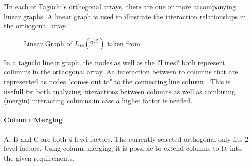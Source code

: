 "In each of Taguchi’s orthogonal arrays, there are one or more accompanying linear graphs. A linear graph is used to illustrate the interaction relationships in the orthogonal array."\cite{yang_design_2009}

\begin{figure}[H]
	\centering
{}
\caption{ Linear Graph of $L_{16}(2^{15})$ taken from \cite{yang_design_2009}}
\end{figure}


In a taguchi linear graph, the nodes as well as the ?Lines? both represent collumns in the orthogonal array. An interaction between to columns that are represented as nodes "comes out to" to the connecting line column \cite{taguchi_taguchis_2005}. This is usefull for both analyzing interactions between columns as well as combining (mergin) interacting columns in case a higher factor is needed.

\paragraph{Column Merging}
A, B and C are both 4 level factors. The currently selected orthogonal only fits 2 level factors. Using column merging, it is possible to extend columns to fit into the given requirements.

